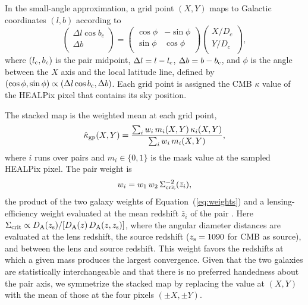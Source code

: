 \documentclass[twocolumn,anonymous,linenumbers]{aastex701}
\begin{document}
In the small-angle approximation, a grid point $(X,Y)$ maps to Galactic coordinates $(l, b)$ according to
\begin{equation}
  \begin{pmatrix}  
    \Delta l \cos b_c \\  
    \Delta b \\  
  \end{pmatrix}  
=
  \begin{pmatrix}  
    \cos\phi & -\sin\phi \\  
    \sin\phi &  \cos\phi \\
  \end{pmatrix}  
  \begin{pmatrix}  
    X/D_c\\
    Y/D_c\\
  \end{pmatrix},  
  \label{eq:grid_to_sky}
\end{equation}
where $(l_{\rm c},b_{\rm c})$ is the pair midpoint, $\Delta l = l-l_{\rm c}$, $\Delta b = b-b_{\rm c}$, and $\phi$ is the angle between the $X$ axis and the local latitude line, defined by
$(\cos\phi,\sin\phi)\propto(\Delta l\cos b_{\rm c},\Delta b)$.
Each grid point is assigned the CMB $\kappa$ value of the HEALPix pixel that contains its sky position. 

The stacked map is the weighted mean at each grid point,
\begin{equation}
  \hat\kappa_{\rm gp}(X,Y) = \frac{\sum_{i} w_{i}\,m_{i}(X,Y)\,\kappa_{i}(X,Y)}
                         {\sum_{i} w_{i}\,m_{i}(X,Y)},
  \label{eq:stack}
\end{equation}
where $i$ runs over pairs and $m_{i}\in\{0,1\}$ is the mask value at
the sampled HEALPix pixel. The pair weight is
\begin{equation}
  w_{i} = w_{1}\,w_{2}\,\Sigma_{\rm crit}^{-2}(\bar z_{i}),
  \label{eq:pair_weight}
\end{equation}
the product of the two galaxy weights of Equation~(\ref{eq:weights}) and a
lensing-efficiency weight evaluated at the mean redshift $\bar z_{i}$ of the pair \citep[e.g.,][]{EppsHudson2017}. Here
$\Sigma_{\rm crit}\propto D_{\rm A}(z_{\rm s})/[D_{\rm A}(z)\,D_{\rm A}(z,z_{\rm s})]$, 
where the angular diameter distances are evaluated at the lens redshift, the source redshift ($z_{\rm s}=1090$ for CMB as source), and between the lens and source redshift. This weight favors the redshifts at
which a given mass produces the largest convergence. 
Given that the two galaxies are statistically interchangeable and that there is no preferred handedness about the pair axis, we symmetrize  the stacked map by replacing the value at $(X,Y)$ with the mean of those at the four pixels $(\pm X,\pm Y)$.
\end{document}

